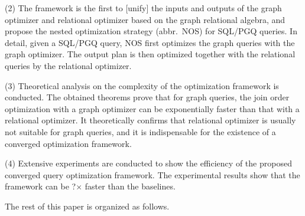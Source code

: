 (2) The framework is the first to [unify] the inputs and outputs of the graph optimizer and relational optimizer based on the graph relational algebra, and propose the nested optimization strategy (abbr.~NOS) for SQL/PGQ queries.
In detail, given a SQL/PGQ query, NOS first optimizes the graph queries with the graph optimizer.
The output plan is then optimized together with the relational queries by the relational optimizer.

(3) Theoretical analysis on the complexity of the optimization framework is conducted.
The obtained theorems prove that for graph queries, the join order optimization with a graph optimizer can be exponentially faster than that with a relational optimizer. 
It theoretically confirms that relational optimizer is usually not suitable for graph queries, and it is indispensable for the existence of a converged optimization framework.

(4) Extensive experiments are conducted to show the efficiency of the proposed converged query optimization framework.
The experimental results show that the framework can be ?$\times$ faster than the baselines.

The rest of this paper is organized as follows.


